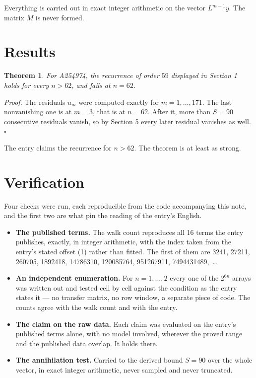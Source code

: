 \documentclass[11pt]{article}
\newtheorem{theorem}{Theorem}
\theoremstyle{definition}
\begin{document}
Everything is carried out in exact integer arithmetic on the vector $L^{m-1}y$. The matrix $M$ is never formed.

\section{Results}

\begin{theorem} For A254974, the recurrence of order $59$ displayed in Section 1 holds for every $n > 62$, and fails at $n = 62$.\end{theorem}

{\itshape Proof.} The residuals $u_m$ were computed exactly for $m = 1,\dots,171$. The last nonvanishing one is at $m = 3$, that is at $n = 62$. After it, more than $S = 90$ consecutive residuals vanish, so by Section 5 every later residual vanishes as well. $\square$

The entry claims the recurrence for $n > 62$. The theorem is at least as strong.

\section{Verification}

Four checks were run, each reproducible from the code accompanying this note, and the first two are what pin the reading of the entry's English.

\begin{itemize}

\item {\bfseries The published terms.} The walk count reproduces all 16 terms the entry publishes, exactly, in integer arithmetic, with the index taken from the entry's stated offset (1) rather than fitted. The first of them are 3241, 27211, 260705, 1892418, 14786310, 120085764, 951267911, 7494431489,~\dots

\item {\bfseries An independent enumeration.} For $n = 1,\dots,2$ every one of the $2^{6n}$ arrays was written out and tested cell by cell against the condition as the entry states it --- no transfer matrix, no row window, a separate piece of code. The counts agree with the walk count and with the entry.

\item {\bfseries The claim on the raw data.} Each claim was evaluated on the entry's published terms alone, with no model involved, wherever the proved range and the published data overlap. It holds there.

\item {\bfseries The annihilation test.} Carried to the derived bound $S = 90$ over the whole vector, in exact integer arithmetic, never sampled and never truncated.

\end{itemize}
\end{document}
